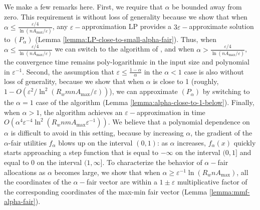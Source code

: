 \documentclass[11pt]{article}
\newcommand{\wratio}{R_w}
\begin{document}
We make a few remarks here. First, we require that $\alpha$ be bounded away from zero. This requirement is without loss of generality because we show that when $\alpha \leq \frac{\varepsilon/4}{\ln(nA_{\max}/\varepsilon)}$, any $\varepsilon-$approximation LP provides a $3\varepsilon-$approximate solution to $(P_\alpha)$ (Lemma \ref{lemma:LP-close-to-small-alpha-fair}). Thus, when $\alpha \leq \frac{\varepsilon/4}{\ln(nA_{\max}/\varepsilon)}$ we can switch to the algorithm of \cite{AwerbuchKhandekar2009}, and when $\alpha > \frac{\varepsilon/4}{\ln(nA_{\max}/\varepsilon)}$, the convergence time remains poly-logarithmic in the input size and polynomial in $\varepsilon^{-1}$. Second, the assumption that $\varepsilon\leq \frac{1-\alpha}{\alpha}$ in the $\alpha<1$ case is also without loss of generality, because we show that when $\alpha$ is close to 1 (roughly, $1 - O(\varepsilon^2/\ln^2(\wratio mnA_{\max}/\varepsilon))$), we can approximate $(P_\alpha)$ by switching to the $\alpha=1$ case of the algorithm (Lemma \ref{lemma:alpha-close-to-1-below}). 
Finally, when $\alpha > 1$, the algorithm achieves an $\varepsilon-$approximation in time ${O}(\alpha^4\varepsilon^{-4} \ln^2(\wratio nmA_{\max}\varepsilon^{-1}))$. We believe that a polynomial dependence on $\alpha$ is difficult to avoid in this setting, because by increasing $\alpha$, the gradient of the $\alpha$-fair utilities $f_{\alpha}$ blows up on the interval $(0, 1)$: as $\alpha$ increases, $f_{\alpha}(x)$ quickly starts approaching a step function that is equal to $-\infty$ on the interval $(0, 1]$ and equal to 0 on the interval $(1, \infty]$. To characterize the behavior of $\alpha-$fair allocations as $\alpha$ becomes large, we show that when $\alpha \geq {\varepsilon}^{-1}{\ln(\wratio n A_{\max})}$, all the coordinates of the $\alpha-$fair vector are within a $1\pm \varepsilon$ multiplicative factor of the corresponding coordinates of the max-min fair vector (Lemma \ref{lemma:mmf-alpha-fair}). 
\end{document}
